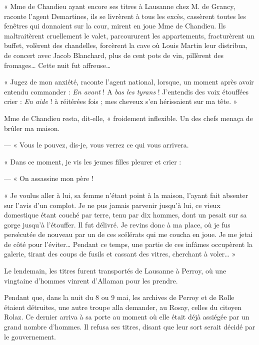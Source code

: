 \documentclass[french,twoside]{book} %
\newenvironment{quoteblock}%
  {\begin{quoting}}
  {\end{quoting}}
\newenvironment{quotebar}{%
    \def\FrameCommand{{\color{rubric!10!}\vrule width 0.5em} \hspace{0.9em}}%
    \def\OuterFrameSep{\itemsep} %
    \MakeFramed {\advance\hsize-\width \FrameRestore}
  }%
  {%
    \endMakeFramed
  }
\renewenvironment{quoteblock}%
  {%
    \savenotes
    \setstretch{0.9}
    \begin{quotebar}
  }
  {%
    \end{quotebar}
    \spewnotes
  }
\begin{document}
\begin{quoteblock}
 \noindent « Mme de Chandieu ayant encore ses titres à Lausanne chez M. de Grancy, raconte l’agent Demartines, ils se livrèrent à tous les excès, cassèrent toutes les fenêtres qui donnaient sur la cour, mirent en joue Mme de Chandieu. Ils maltraitèrent cruellement le valet, parcoururent les appartements, fracturèrent un buffet, volèrent des chandelles, forcèrent la cave où Louis Martin leur distribua, de concert avec Jacob Blanchard, plus de cent pots de vin, pillèrent des fromages… Cette nuit fut affreuse…\par
 « Jugez de mon anxiété, raconte l’agent national, lorsque, un moment après avoir entendu commander : \emph{En avant} ! A \emph{bas les tyrans} ! J’entendis des voix étouffées crier : \emph{En aide} ! à réitérées fois ; mes cheveux s’en hérissaient sur ma tête. »\par
 Mme de Chandieu resta, dit-elle, « froidement inflexible. Un des chefs menaça de brûler ma maison.\par
 — « Vous le pouvez, dis-je, vous verrez ce qui vous arrivera.\par
 « Dans ce moment, je vis les jeunes filles pleurer et crier :\par
 — « On assassine mon père !\par
 « Je voulus aller à lui, sa femme n’étant point à la maison, l’ayant fait absenter sur l’avis d’un complot. Je ne pus jamais parvenir jusqu’à lui, ce vieux domestique étant couché par terre, tenu par dix hommes, dont un pesait sur sa gorge jusqu’à l’étouffer. Il fut délivré. Je revins donc à ma place, où je fus persécutée de nouveau par un de ces scélérats qui me coucha en joue. Je me jetai de côté pour l’éviter… Pendant ce temps, une partie de ces infâmes occupèrent la galerie, tirant des coups de fusils et cassant des vitres, cherchant à voler… »
 \end{quoteblock}

\noindent Le lendemain, les titres furent transportés de Lausanne à Perroy, où une vingtaine d’hommes vinrent d’Allaman pour les prendre.\par
Pendant que, dans la nuit du 8 ou 9 mai, les archives de Perroy et de Rolle étaient détruites, une autre troupe alla demander, au Rosay, celles du citoyen Rolaz. Ce dernier arriva à sa porte au moment où elle était déjà assiégée par un grand nombre d’hommes. Il refusa ses titres, disant que leur sort serait décidé par le gouvernement.\par
\end{document}
